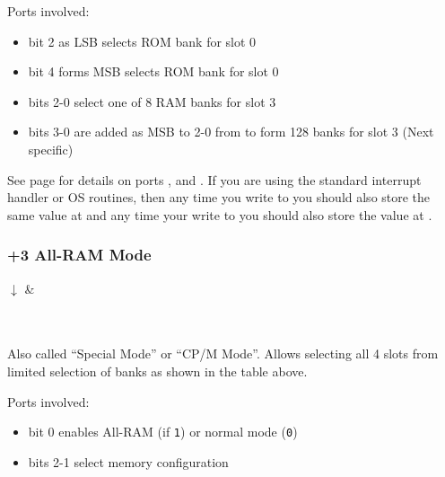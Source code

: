 \pagebreak
Ports involved:

\begin{itemize}[topsep=0pt,itemsep=0pt]
	\item {} bit 2 as LSB selects ROM bank for slot 0
	\item {} bit 4 forms MSB selects ROM bank for slot 0
	\item {} bits 2-0 select one of 8 RAM banks for slot 3
	\item {} bits 3-0 are added as MSB to 2-0 from  to form 128 banks for slot 3 (Next specific)
\end{itemize}

See page  for details on ports ,  and . If you are using the standard interrupt handler or OS routines, then any time you write to  you should also store the same value at  and any time your write to  you should also store the value at .


\subsubsection{+3 All-RAM Mode}

\begin{PagingTableLegacy}
	\PagingTableLegacyItem{}{$\uparrow$}{$\uparrow$}{$\uparrow$}{$\uparrow$}
	$\downarrow$ & \\
	 \\
	 \\
\end{PagingTableLegacy}

Also called ``Special Mode'' or ``CP/M Mode''. Allows selecting all 4 slots from limited selection of banks as shown in the table above.

Ports involved:

\begin{itemize}[topsep=0pt,itemsep=0pt]
	\item {} bit 0 enables All-RAM (if {\tt 1}) or normal mode ({\tt 0})
	\item {} bits 2-1 select memory configuration
\end{itemize}


